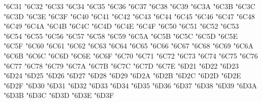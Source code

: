 {\Uchar\jis"6C31 %
\Uchar\jis"6C32 %
\Uchar\jis"6C33 %
\Uchar\jis"6C34 %
\Uchar\jis"6C35 %
\Uchar\jis"6C36 %
\Uchar\jis"6C37 %
\Uchar\jis"6C38 %
\Uchar\jis"6C39 %
\Uchar\jis"6C3A %
\Uchar\jis"6C3B %
\Uchar\jis"6C3C %
\Uchar\jis"6C3D %
\Uchar\jis"6C3E %
\Uchar\jis"6C3F %
\Uchar\jis"6C40 %
\Uchar\jis"6C41 %
\Uchar\jis"6C42 %
\Uchar\jis"6C43 %
\Uchar\jis"6C44 %
\Uchar\jis"6C45 %
\Uchar\jis"6C46 %
\Uchar\jis"6C47 %
\Uchar\jis"6C48 %
\Uchar\jis"6C49 %
\Uchar\jis"6C4A %
\Uchar\jis"6C4B %
\Uchar\jis"6C4C %
\Uchar\jis"6C4D %
\Uchar\jis"6C4E %
\Uchar\jis"6C4F %
\Uchar\jis"6C50 %
\Uchar\jis"6C51 %
\Uchar\jis"6C52 %
\Uchar\jis"6C53 %
\Uchar\jis"6C54 %
\Uchar\jis"6C55 %
\Uchar\jis"6C56 %
\Uchar\jis"6C57 %
\Uchar\jis"6C58 %
\Uchar\jis"6C59 %
\Uchar\jis"6C5A %
\Uchar\jis"6C5B %
\Uchar\jis"6C5C %
\Uchar\jis"6C5D %
\Uchar\jis"6C5E %
\Uchar\jis"6C5F %
\Uchar\jis"6C60 %
\Uchar\jis"6C61 %
\Uchar\jis"6C62 %
\Uchar\jis"6C63 %
\Uchar\jis"6C64 %
\Uchar\jis"6C65 %
\Uchar\jis"6C66 %
\Uchar\jis"6C67 %
\Uchar\jis"6C68 %
\Uchar\jis"6C69 %
\Uchar\jis"6C6A %
\Uchar\jis"6C6B %
\Uchar\jis"6C6C %
\Uchar\jis"6C6D %
\Uchar\jis"6C6E %
\Uchar\jis"6C6F %
\Uchar\jis"6C70 %
\Uchar\jis"6C71 %
\Uchar\jis"6C72 %
\Uchar\jis"6C73 %
\Uchar\jis"6C74 %
\Uchar\jis"6C75 %
\Uchar\jis"6C76 %
\Uchar\jis"6C77 %
\Uchar\jis"6C78 %
\Uchar\jis"6C79 %
\Uchar\jis"6C7A %
\Uchar\jis"6C7B %
\Uchar\jis"6C7C %
\Uchar\jis"6C7D %
\Uchar\jis"6C7E %
\Uchar\jis"6D21 %
\Uchar\jis"6D22 %
\Uchar\jis"6D23 %
\Uchar\jis"6D24 %
\Uchar\jis"6D25 %
\Uchar\jis"6D26 %
\Uchar\jis"6D27 %
\Uchar\jis"6D28 %
\Uchar\jis"6D29 %
\Uchar\jis"6D2A %
\Uchar\jis"6D2B %
\Uchar\jis"6D2C %
\Uchar\jis"6D2D %
\Uchar\jis"6D2E %
\Uchar\jis"6D2F %
\Uchar\jis"6D30 %
\Uchar\jis"6D31 %
\Uchar\jis"6D32 %
\Uchar\jis"6D33 %
\Uchar\jis"6D34 %
\Uchar\jis"6D35 %
\Uchar\jis"6D36 %
\Uchar\jis"6D37 %
\Uchar\jis"6D38 %
\Uchar\jis"6D39 %
\Uchar\jis"6D3A %
\Uchar\jis"6D3B %
\Uchar\jis"6D3C %
\Uchar\jis"6D3D %
\Uchar\jis"6D3E %
\Uchar\jis"6D3F %
}
